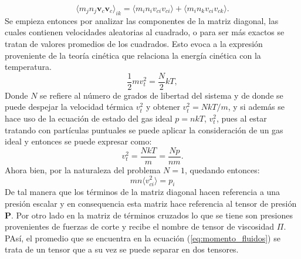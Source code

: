 \documentclass[../tesis_main_file.tex]{subfiles}
\begin{document}
\begin{equation}
\langle m_j n_j \textbf{v}_c \textbf{v}_c \rangle _{ik}=\langle m_i n_iv_{ci}v_{ci}\rangle+ \langle m_i n_kv_{ci}v_{ck}\rangle.
\end{equation}
Se empieza entonces por analizar las componentes de la matriz diagonal,
las cuales contienen velocidades aleatorias al cuadrado, o para ser más exactos se tratan de valores promedios de los cuadrados. Esto evoca a la expresión proveniente de la teoría cinética que relaciona la energía cinética con la temperatura.
\begin{equation}
\frac{1}{2}mv_t^2=\frac{N}{2}kT,
\end{equation}
Donde $N$ se refiere al número de grados de libertad del sistema y de donde se puede despejar la velocidad térmica $v_t^2$ y obtener $v_t^2=NkT/m$, y si además se hace uso de la ecuación de estado del gas ideal $p=nkT$, $v^2_t$, pues al estar tratando con partículas puntuales se puede aplicar la consideración de un gas ideal y entonces se puede expresar como:
\begin{equation}
v_t^2=\frac{NkT}{m}=\frac{Np}{nm}.
\end{equation}
Ahora bien, por la naturaleza del problema $N=1$, quedando entonces:
\begin{equation}
mn \langle v_{ci}^2\rangle = p_i
\end{equation} 
De tal manera que los términos de la matriz diagonal hacen referencia a una presión escalar y en consequencia esta matriz hace referencia al tensor de presión $\textbf{P}$.
Por otro lado en la matriz de términos cruzados lo que se tiene son presiones provenientes de fuerzas de corte \cite{bittencourt2013fundamentals} y recibe el nombre de tensor de viscosidad \textbf{$\Pi$}. PAsí, el promedio que se encuentra en la ecuación (\ref{eq:momento_fluidos}) se trata de un tensor que a su vez se puede separar en dos tensores.
\end{document}
